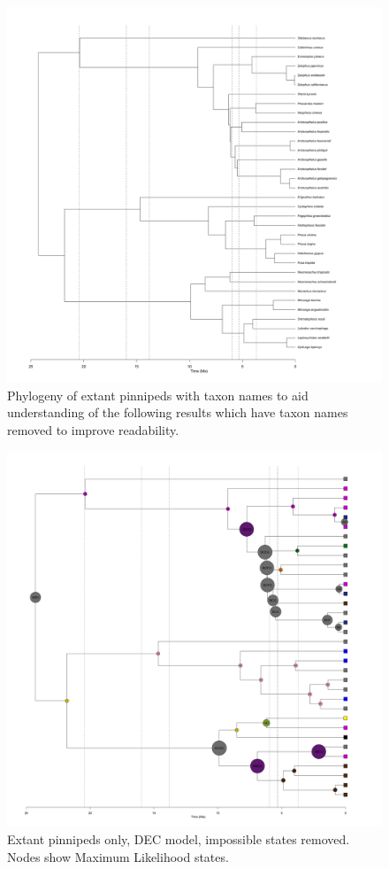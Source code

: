 \documentclass[a4paper, 12pt]{article}
\begin{document}
\begin{figure}[H]
 \centering
  \includegraphics[width = \linewidth]{figures/extant-pinnipeds-tree.png}
  \caption{Phylogeny of extant pinnipeds with taxon names to aid understanding of the following results which have taxon names removed to improve readability.}
  \label{fig-extant-tree}
\end{figure} 

\begin{figure}[H]
 \centering
  \includegraphics[width = \linewidth]{figures/extant-pinnipeds-DEC-impossible-MLstates.png}
  \caption{Extant pinnipeds only, DEC model, impossible states removed. Nodes show Maximum Likelihood states.}
  \label{fig-extant-dec-ml}
\end{figure} 
\end{document}
